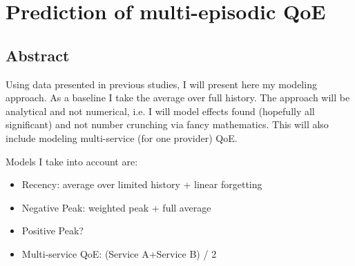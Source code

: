 \chapter{Prediction of multi-episodic QoE}\label{chap:08}
\section*{Abstract}
Using data presented in previous studies, I will present here my modeling approach.
As a baseline I take the average over full history.
The approach will be analytical and not numerical, i.e. I will model effects found (hopefully all significant) and not number crunching via fancy mathematics.
This will also include modeling multi-service (for one provider) QoE.

Models I take into account are:
\begin{itemize}
\item Recency: average over limited history + linear forgetting
\item Negative Peak: weighted peak + full average
\item Positive Peak?
\item Multi-service QoE: (Service A+Service B) / 2
\end{itemize}